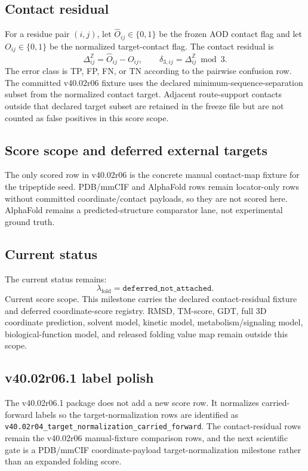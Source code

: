 \subsection{Contact residual}

For a residue pair $(i,j)$, let $\widehat O_{ij}\in\{0,1\}$ be the frozen AOD contact flag and let $O_{ij}\in\{0,1\}$ be the normalized target-contact flag. The contact residual is
\[
\Delta^{\mathbb Z}_{ij}=\widehat O_{ij}-O_{ij},\qquad
\delta_{3,ij}=\Delta^{\mathbb Z}_{ij}\bmod 3.
\]
The error class is TP, FP, FN, or TN according to the pairwise confusion row. The committed v40.02r06 fixture uses the declared minimum-sequence-separation subset from the normalized contact target. Adjacent route-support contacts outside that declared target subset are retained in the freeze file but are not counted as false positives in this score scope.

\subsection{Score scope and deferred external targets}

The only scored row in v40.02r06 is the concrete manual contact-map fixture for the tripeptide seed. PDB/mmCIF and AlphaFold rows remain locator-only rows without committed coordinate/contact payloads, so they are not scored here. AlphaFold remains a predicted-structure comparator lane, not experimental ground truth.


\subsection{Current status}

The current status remains:
\[
\lambda_{\mathrm{fold}}=\texttt{deferred\_not\_attached}.
\]
Current score scope. This milestone carries the declared contact-residual fixture and deferred coordinate-score registry. RMSD, TM-score, GDT, full 3D coordinate prediction, solvent model, kinetic model, metabolism/signaling model, biological-function model, and released folding value map remain outside this scope.


\subsection{v40.02r06.1 label polish}

The v40.02r06.1 package does not add a new score row. It normalizes carried-forward labels so the target-normalization rows are identified as \texttt{v40.02r04\_target\_normalization\_carried\_forward}. The contact-residual rows remain the v40.02r06 manual-fixture comparison rows, and the next scientific gate is a PDB/mmCIF coordinate-payload target-normalization milestone rather than an expanded folding score.
